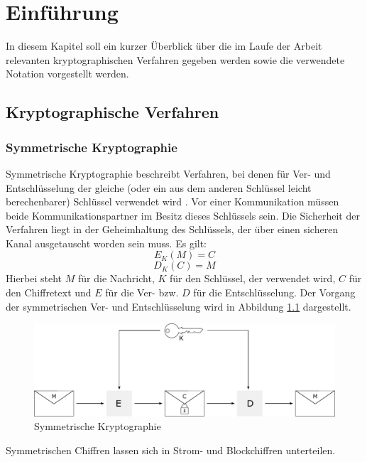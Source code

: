\chapter{Einführung}

\label{cha_cryptographic_techniques}

In diesem Kapitel soll ein kurzer Überblick über die im Laufe der Arbeit relevanten kryptographischen Verfahren gegeben werden sowie die verwendete Notation vorgestellt werden.

\section{Kryptographische Verfahren}

\subsection{Symmetrische Kryptographie}

Symmetrische Kryptographie beschreibt Verfahren, bei denen für Ver- und Entschlüsselung der gleiche (oder ein aus dem anderen Schlüssel leicht berechenbarer) Schlüssel verwendet wird \cite{Schneier2006}. Vor einer Kommunikation müssen beide Kommunikationspartner im Besitz dieses Schlüssels sein. Die Sicherheit der Verfahren liegt in der Geheimhaltung des Schlüssels,  der über einen sicheren Kanal ausgetauscht worden sein muss.
Es gilt:
\[E_K(M)=C\] 
\[D_K(C)=M\] 
Hierbei steht \(M\) für die Nachricht, \(K\) für den Schlüssel, der verwendet wird, \(C\) für den Chiffretext und \(E\) für die Ver- bzw. \(D\) für die  Entschlüsselung. Der Vorgang der symmetrischen Ver- und Entschlüsselung wird in Abbildung \ref{fig_symmetric_encryption} dargestellt.

\begin{figure}
	\centering
	\includegraphics[width=15cm]{Diagrams/SymmetricEncryption.pdf} %
	\caption{Symmetrische Kryptographie}
	\label{fig_symmetric_encryption}
\end{figure}

Symmetrischen Chiffren lassen sich in Strom- und Blockchiffren unterteilen.

